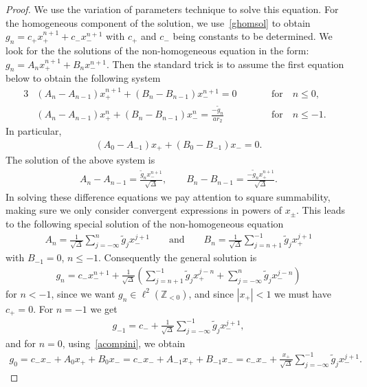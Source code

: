 \documentclass[11pt]{article}
\numberwithin{equation}{section}
\begin{document}
\begin{proof}
We use the variation of parameters technique to solve this equation.
For the homogeneous component of the solution, we use~\eqref{ghomsol} to obtain $g_n=c_+x_+^{n+1}+c_-x_-^{n+1}$ with
$c_+$ and $c_-$ being constants to be determined.
We look for the the solutions of the non-homogeneous equation in the form: $g_n=A_nx_+^{n+1}+B_nx_-^{n+1}$.
Then the standard trick is to assume the f\/irst equation below to obtain the following system
\begin{alignat*}{3}
&  (A_n -A_{n-1})x_+^{n+1}+(B_n-B_{n-1})x_-^{n+1}=0 \qquad &&\text{for}\quad  n\leq 0,&
\\
& (A_n -A_{n-1})x_+^n+(B_n-B_{n-1})x_-^n=\frac{-\tilde{g}_n}{ar_2} \qquad && \text{for}\quad  n\leq -1. &
\end{alignat*}
In particular,
\begin{gather}
\label{acompini}
(A_0 -A_{-1})x_++(B_0-B_{-1})x_-=0.
\end{gather}
The solution of the above system is
\begin{gather}
\label{acompgen}
A_n-A_{n-1}=\frac{\tilde{g}_nx_-^{n+1}}{\sqrt{\Delta}},
\qquad
B_n-B_{n-1}=\frac{-\tilde{g}_nx_+^{n+1}}{\sqrt{\Delta}}.
\end{gather}
In solving these dif\/ference equations we pay attention to square summability, making sure we only consider convergent
expressions in powers of $x_\pm$.
This leads to the following special solution of the non-homogeneous equation
\begin{gather*}
A_n=\frac{1}{\sqrt{\Delta}}\sum\limits_{j=-\infty}^n\tilde{g}_jx_-^{j+1}
\qquad
\text{and}
\qquad
B_n=\frac{1}{\sqrt{\Delta}}\sum\limits_{j=n+1}^{-1}\tilde{g}_jx_+^{j+1}
\end{gather*}
with $B_{-1}=0$, $n\leq -1$.
Consequently the general solution is
\begin{gather*}
g_n=c_-x_-^{n+1}+\frac{1}{\sqrt{\Delta}}\left(\sum\limits_{j=n+1}^{-1}\tilde{g}_jx_+^{j-n}+\sum\limits_{j=-\infty}^n\tilde{g}_jx_-^{j-n}\right)
\end{gather*}
for $n<-1$, since we want $g_n\in\ell^2({\mathbb Z}_{<0})$, and since $|x_+|<1$ we must have $c_+=0$.
For $n=-1$ we get
\begin{gather*}
g_{-1}=c_-+\frac{1}{\sqrt{\Delta}}\sum\limits_{j=-\infty}^{-1}\tilde{g}_jx_-^{j+1},
\end{gather*}
and for $n=0$, using~\eqref{acompini}, we obtain
\begin{gather*}
g_{0}=c_- x_-+A_0x_++B_0x_-= c_- x_-+A_{-1}x_++B_{-1}x_-=c_- x_-+\frac{x_+}{\sqrt{\Delta}}\sum\limits_{j=-\infty}^{-1}\tilde{g}_jx_-^{j+1}.
\end{gather*}


\end{proof}
\end{document}
